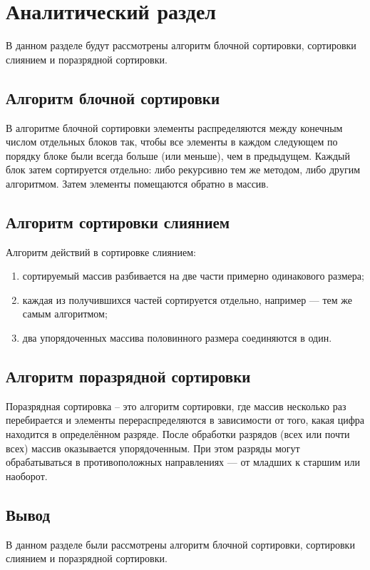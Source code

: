 \chapter{Аналитический раздел}

В данном разделе будут рассмотрены алгоритм блочной сортировки, сортировки слиянием и поразрядной сортировки.

\section{Алгоритм блочной сортировки}

В алгоритме блочной сортировки элементы распределяются между конечным числом отдельных блоков так, чтобы все элементы в каждом следующем по порядку блоке были всегда больше (или меньше), чем в предыдущем. 
Каждый блок затем сортируется отдельно: либо рекурсивно тем же методом, либо другим алгоритмом. Затем элементы помещаются обратно в массив. 

\section{Алгоритм сортировки слиянием}

Алгоритм действий в сортировке слиянием:

\begin{enumerate}[label={\arabic*)}]
	\item сортируемый массив разбивается на две части примерно одинакового размера;
	\item каждая из получившихся частей сортируется отдельно, например — тем же самым алгоритмом;
	\item два упорядоченных массива половинного размера соединяются в один.
\end{enumerate}


\section{Алгоритм поразрядной сортировки}

Поразрядная сортировка \cite{radix} -- это алгоритм сортировки, где массив
несколько раз перебирается и элементы перераспределяются в зависимости от того, какая цифра находится в определённом разряде. После обработки разрядов (всех или почти всех) массив оказывается упорядоченным. При этом разряды могут обрабатываться в противоположных направлениях — от младших к старшим или наоборот.

\section*{Вывод}

В данном разделе были рассмотрены алгоритм блочной сортировки, сортировки слиянием и поразрядной сортировки.
